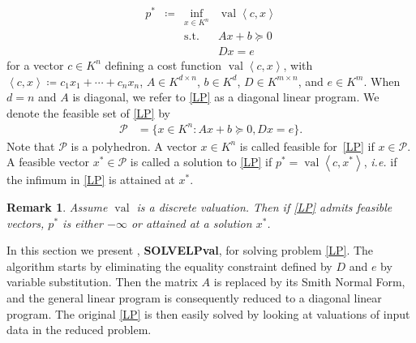 \documentclass[sigconf]{acmart}
\newcommand{\PP}{\mathcal{P}}
\newtheorem{remark}[theorem]{Remark}
\DeclareMathOperator{\val}{val}
\begin{document}
\begin{equation}
  \tag{LP}\label{LP}
\begin{array}{rcll}
  p^* & \coloneq & \inf_{x \in K^n} & \val \left\langle c, x \right\rangle \\
  &    & \text{s.t.}         & A x + b \succeq 0\\
  & & & D x = e
\end{array}
\end{equation}
for a vector $c \in K^n$ defining a cost function $\val\left\langle c, x \right\rangle$,
with $\left\langle c, x \right\rangle \coloneq c_1 x_1+\cdots +c_n x_n$,
$A \in K^{d \times n}$, $b \in K^d$, $D \in K^{m\times n}$, and $e \in K^m$.
When $d=n$ and $A$ is diagonal, %
we refer to \eqref{LP} as a {diagonal} linear program.
We denote the {feasible set} of \eqref{LP} by
\begin{equation*}
\begin{aligned}
  \PP &= \{x \in K^n : Ax + b \succeq 0, Dx = e\}.
\end{aligned}
\end{equation*}
Note that $\PP$ is a polyhedron.
A vector $x \in K^n$ is called {feasible} for~\eqref{LP} if $x \in \PP$. A feasible vector $x^* \in \PP$ is called a {solution} to \eqref{LP} if $p^* = \val\left\langle c,x^*\right\rangle$, {\it i.e.} if the infimum in \eqref{LP} is attained at $x^*$.

\begin{remark}
  Assume $\val$ is a discrete valuation. Then
  if \eqref{LP} admits feasible vectors,
  $p^*$ is either $-\infty$ or attained at a solution $x^*$.
\end{remark}

In this section we present , \textbf{SOLVELPval}, for solving problem \eqref{LP}.
The algorithm starts by eliminating the equality constraint defined by $D$ and $e$
by variable substitution. Then the matrix $A$ is replaced by its Smith Normal Form,
and the general linear program is consequently reduced to a diagonal linear program.
The original \eqref{LP} is then easily solved by looking at valuations of input data
in the reduced problem.
\end{document}
